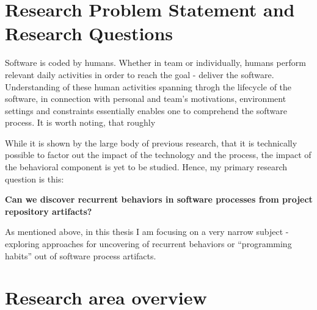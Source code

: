 \section{Research Problem Statement and Research Questions}
Software is coded by humans. Whether in team or individually, humans perform relevant 
daily activities in order to reach the goal - deliver the software. Understanding of these
human activities spanning throgh the lifecycle of the software, in connection with personal 
and team's motivations, environment settings and constraints essentially enables one to
comprehend the software process. It is worth noting, that roughly 


While it is shown by the large body of previous research, that it is technically possible 
to factor out the impact of the technology and the process, the impact of the behavioral 
component is yet to be studied. Hence, my primary research question is this:
\begin{myindentpar}{0.07\linewidth}
 \textbf{Can we discover recurrent behaviors in software processes from project
  repository artifacts?}
\end{myindentpar}
 
As mentioned above, in this thesis I am focusing on a very narrow subject - exploring approaches
for uncovering of recurrent behaviors or ``programming habits'' out of software process artifacts.



\section{Research area overview}
